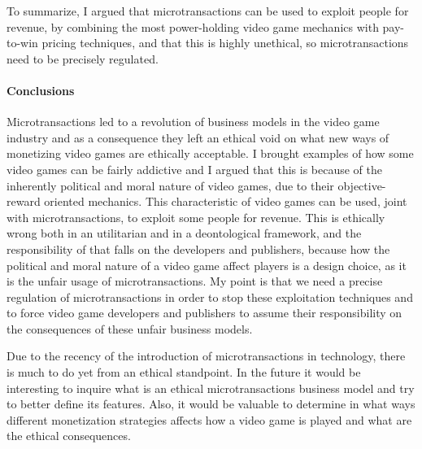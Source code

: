 \documentclass[10pt,a4paper]{article}
\begin{document}
To summarize, I argued that microtransactions can be used to exploit people for revenue, by combining the most power-holding video game mechanics with pay-to-win pricing techniques, and that this is highly unethical, so microtransactions need to be precisely regulated.

\paragraph{Conclusions}
Microtransactions led to a revolution of business models in the video game industry and as a consequence they left an ethical void on what new ways of monetizing video games are ethically acceptable.
I brought examples of how some video games can be fairly addictive and I argued that this is because of the inherently political and moral nature of video games, due to their objective-reward oriented mechanics.
This characteristic of video games can be used, joint with microtransactions, to exploit some people for revenue.
This is ethically wrong both in an utilitarian and in a deontological framework, and the responsibility of that falls on the developers and publishers, because how the political and moral nature of a video game affect players is a design choice, as it is the unfair usage of microtransactions.
My point is that we need a precise regulation of microtransactions in order to stop these exploitation techniques and to force video game developers and publishers to assume their responsibility on the consequences of these unfair business models.

Due to the recency of the introduction of microtransactions in technology, there is much to do yet from an ethical standpoint. 
In the future it would be interesting to inquire what is an ethical microtransactions business model and try to better define its features.
Also, it would be valuable to determine in what ways different monetization strategies affects how a video game is played and what are the ethical consequences.
%
\printbibliography
%
\end{document}
